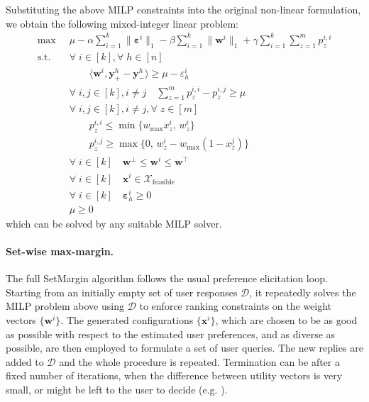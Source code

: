\documentclass{article}
\renewcommand\[{\begin{equation}}
\renewcommand\]{\end{equation}}
\newcommand{\calvar}[1]{\ensuremath{\mathcal{#1}}}
\newcommand{\calD}{\calvar{D}}
\newcommand{\calX}{\calvar{X}}
\newcommand{\vecvar}[1]{\ensuremath{\boldsymbol{#1}}}
\newcommand{\vw}{\vecvar{w}}
\newcommand{\vx}{\vecvar{x}}
\newcommand{\vy}{\vecvar{y}}
\newcommand{\veps}{\vecvar{\varepsilon}}
\begin{document}
Substituting the above MILP constraints into the original non-linear
formulation, we obtain the following mixed-integer linear problem:
%
{\footnotesize
\begin{align}
    \max
        & \;\; \mu - \alpha \sum_{i=1}^k \| \veps^{i} \|_1 - \beta \sum_{i=1}^k \| \vw^{i} \|_1 + \gamma \sum_{i=1}^k \sum_{z=1}^m p^{i,i}_z
        \nonumber
    \\
    \text{s.t.}
        & \;\; \forall \; i \in [k], \forall \; h \in [n] \nonumber
    \\
        & \;\; \qquad \langle \vw^{i}, \vy^{h}_+ - \vy^{h}_- \rangle \ge \mu - \varepsilon^{i}_h \nonumber
    \\
        & \;\; \forall \; i, j \in [k], i \neq j \quad \sum_{z=1}^m p^{i,i}_z - p^{i,j}_z \ge \mu
    \\
        & \;\; \forall \; i, j \in [k], i \neq j, \forall \; z \in [m] \nonumber
    \\
        & \;\; \qquad p^{i,i}_z \le \min \{ w_\text{max} x^{i}_z, \, w^{i}_z \}
    \\
        & \;\; \qquad p^{i,j}_z \ge \max \{ 0, \, w^{i}_z - w_\text{max}(1 - x^{j}_z) \}
    \\
        & \;\; \forall \; i \in [k] \quad \vw^\bot \le \vw^{i} \le \vw^\top \label{eq:wbounds2}
    \\
        & \;\; \forall \; i \in [k] \quad \vx^{i} \in \calX_{\text{feasible}} \nonumber
    \\
        & \;\; \forall \; i \in [k] \quad \veps^{i}_h \ge 0 \nonumber
    \\
        & \;\; \mu \ge 0 \nonumber
\end{align}
}
%
which can be solved by any suitable MILP solver.

\paragraph{Set-wise max-margin.} The full {\sc SetMargin} algorithm
follows the usual preference elicitation loop. Starting from an
initially empty set of user responses $\calD$, it repeatedly solves
the MILP problem above using $\calD$ to enforce ranking
constraints on the weight vectors $\{\vw^i\}$. The generated
configurations $\{\vx^i\}$, which are chosen to be as good as possible
with respect to the estimated user preferences, and as diverse as
possible, are then employed to formulate a set of user queries. The
new replies are added to $\calD$ and the whole procedure is
repeated. Termination can be after a fixed number of iterations,
when the difference between utility vectors is very small, or might be left
to the user to decide (e.g. \cite{Reilly2007}).
\end{document}
